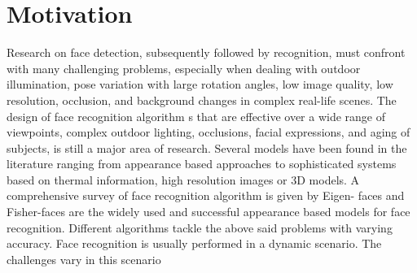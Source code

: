 \section{Motivation}

Research on face detection, subsequently followed by recognition, must confront with many challenging problems, especially   when dealing   with   outdoor illumination, pose   variation   with   large   rotation angles, low image   quality, low resolution, occlusion, and background changes in complex real-life   scenes. The design of face   recognition   algorithm s that are effective over a wide range of  viewpoints,   complex outdoor lighting,   occlusions, facial   expressions,   and   aging  of subjects, is still a major area of research.      Several models have been found in the literature ranging from    appearance based approaches to sophisticated systems based on thermal information, high   resolution   images or   3D   models. A comprehensive survey of face recognition algorithm is given by   Eigen- faces and Fisher-faces are the widely used and successful appearance based models for face recognition. Different algorithms tackle the above said problems  with varying accuracy. Face recognition is usually performed in a dynamic scenario. The challenges vary in this scenario
